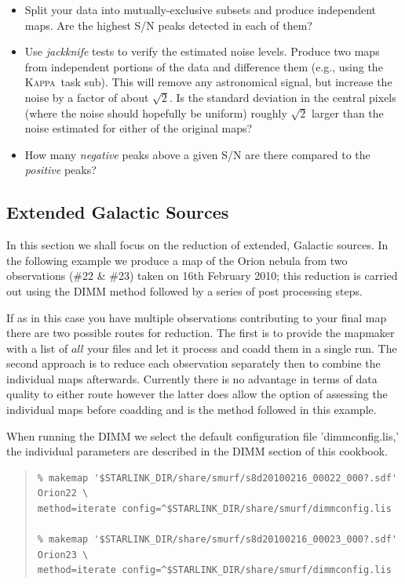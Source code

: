 \documentclass[twoside,11pt]{article}
\newcommand{\xref}[3]{#1}
\newcommand{\xlabel}[1]{}
\renewcommand{\_}{\texttt{\symbol{95}}}
\newenvironment{myquote}{\begin{quote}\begin{small}}{\end{small}\end{quote}}
\newcommand{\Kappa}{\xref{\textsc{Kappa}}{sun95}{}}
\newcommand{\task}[1]{\textsf{#1}}
\newcommand{\sub}{\xref{\task{sub}}{sun95}{SUB}}
\begin{document}
\begin{itemize}

\item Split your data into mutually-exclusive subsets and produce
  independent maps. Are the highest S/N peaks detected in each of
  them?

\item Use {\em jackknife} tests to verify the estimated noise
  levels. Produce two maps from independent portions of the data and
  difference them (e.g., using the \Kappa\ task \sub). This will
  remove any astronomical signal, but increase the noise by a factor
  of about $\sqrt{2}$. Is the standard deviation in the central pixels
  (where the noise should hopefully be uniform) roughly $\sqrt{2}$
  larger than the noise estimated for either of the original maps?

\item How many {\em negative} peaks above a given S/N are there
  compared to the {\em positive} peaks?

\end{itemize}

\subsection{\xlabel{Galactic}Extended Galactic Sources}
\label{sec:galactic}
In this section we shall focus on the reduction of extended, Galactic sources. In the following example we produce a map of the Orion nebula from two observations (\#22 \& \#23) taken on 16th February 2010; this reduction is carried out using the DIMM method followed by a series of post processing steps. 

If as in this case you have multiple observations contributing to your final map there are two possible routes for reduction. The first is to provide the mapmaker with a list of $all$ your files and let it process and coadd them in a single run.  The second approach is to reduce each observation separately then to combine the individual maps afterwards. Currently there is no advantage in terms of data quality to either route however the latter does allow the option of assessing the individual maps before coadding and is the method followed in this example.

When running the DIMM  we select the default configuration file 'dimmconfig.lis,' the individual parameters are described in the DIMM section of this cookbook.

\begin{myquote}
\begin{verbatim}
% makemap '$STARLINK_DIR/share/smurf/s8d20100216_00022_000?.sdf' Orion22 \
method=iterate config=^$STARLINK_DIR/share/smurf/dimmconfig.lis

% makemap '$STARLINK_DIR/share/smurf/s8d20100216_00023_000?.sdf' Orion23 \
method=iterate config=^$STARLINK_DIR/share/smurf/dimmconfig.lis
\end{verbatim}
\end{myquote}
\end{document}
